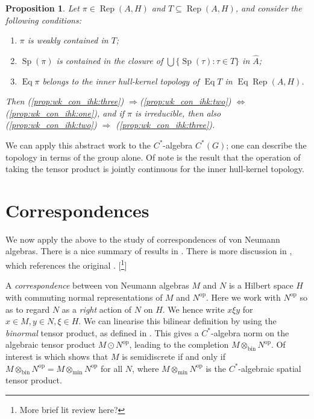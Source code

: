 \documentclass[a4paper,11pt]{article}
\newcommand{\Rep}{\operatorname{Rep}}
\newcommand{\Eq}{\operatorname{Eq}}
\newcommand{\Sp}{\operatorname{Sp}}
\newcommand{\op}{{\operatorname{op}}}
\newcommand{\bin}{{\operatorname{bin}}}
\newtheorem{proposition}[lemma]{Proposition}
\begin{document}
\begin{proposition}
Let $\pi\in\Rep(A,H)$ and $T\subseteq\Rep(A,H)$, and consider the following
conditions:
\begin{enumerate}
\item\label{prop:wk_con_ihk:one} $\pi$ is weakly contained in $T$;
\item\label{prop:wk_con_ihk:two} $\Sp(\pi)$ is contained in the closure of
$\bigcup\{\Sp(\tau) : \tau\in T\}$ in $\hat A$;
\item\label{prop:wk_con_ihk:three} $\Eq\pi$ belongs to the inner hull-kernel
topology of $\Eq T$ in $\Eq\Rep(A,H)$.
\end{enumerate}
Then (\ref{prop:wk_con_ihk:three}) $\Rightarrow $(\ref{prop:wk_con_ihk:two})
$\Leftrightarrow$ (\ref{prop:wk_con_ihk:one}), and if $\pi$ is irreducible,
then also (\ref{prop:wk_con_ihk:two}) $\Rightarrow$
(\ref{prop:wk_con_ihk:three}).
\end{proposition}

We can apply this abstract work to the $C^*$-algebra $C^*(G)$; one can
describe the topology in terms of the group alone.  Of note is the result
that the operation of taking the tensor product is jointly continuous for
the inner hull-kernel topology.


\section{Correspondences}

We now apply the above to the study of correspondences of von Neumann algebras.
There is a nice summary of results in \cite[page~316]{ad1}.  There is more
discussion in \cite[Section~1.12]{ad2}, which references the original \cite{cj}.
[\footnote{More brief lit review here?}]

A \emph{correspondence} between von Neumann algebras $M$ and $N$ is a Hilbert
space $H$ with commuting normal representations of $M$ and $N^\op$.  Here we
work with $N^\op$ so as to regard $N$ as a \emph{right} action of $N$ on $H$.
We hence write $x\xi y$ for $x\in M, y\in N, \xi\in H$.
We can linearise this bilinear definition by using the \emph{binormal}
tensor product, as defined in \cite{el}.  This gives a $C^*$-algebra norm on
the algebraic tensor product $M\odot N^\op$, leading to the completion
$M\otimes_{\bin}N^\op$.  Of interest is \cite[Theorem~4.1]{el} which shows
that $M$ is semidiscrete if and only if $M\otimes_\bin N^\op = M\otimes_{\min}
N^\op$ for all $N$, where $M\otimes_{\min} N^\op$ is the $C^*$-algebraic
spatial tensor product.
\end{document}
